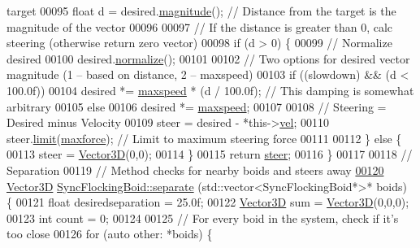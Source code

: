 \begin{DoxyCode}
{       target}
00095     \textcolor{keywordtype}{float} d = desired.\hyperlink{class_vector3_d_a1139cce4839680afb01a9612eda6e117}{magnitude}(); \textcolor{comment}{// Distance from the target is the magnitude of the vector}
00096     
00097     \textcolor{comment}{// If the distance is greater than 0, calc steering (otherwise return zero vector)}
00098     \textcolor{keywordflow}{if} (d > 0) \{
00099         \textcolor{comment}{// Normalize desired}
00100         desired.\hyperlink{class_vector3_d_abfb12ecb9c9beb88e095cc4a1a512d3c}{normalize}();
00101         
00102         \textcolor{comment}{// Two options for desired vector magnitude (1 -- based on distance, 2 -- maxspeed)}
00103         \textcolor{keywordflow}{if} ((slowdown) && (d < 100.0f))
00104             desired *= \hyperlink{class_sync_flocking_boid_a2dbbbab7d604e28ed779dbe098f9803d}{maxspeed} * (d / 100.0f); \textcolor{comment}{// This damping is somewhat arbitrary}
00105         \textcolor{keywordflow}{else}
00106             desired *= \hyperlink{class_sync_flocking_boid_a2dbbbab7d604e28ed779dbe098f9803d}{maxspeed};
00107         
00108         \textcolor{comment}{// Steering = Desired minus Velocity}
00109         steer = desired - *this->\hyperlink{class_sync_flocking_boid_a1b6cf043598e64ecd40ecd5b75beb01f}{vel};
00110         steer.\hyperlink{class_vector3_d_a662cc3834556d61ed29890135c280b04}{limit}(\hyperlink{class_sync_flocking_boid_add7d9f2bf292a749bd17e730027e7350}{maxforce});  \textcolor{comment}{// Limit to maximum steering force}
00111         
00112     \} \textcolor{keywordflow}{else} \{
00113         steer = \hyperlink{class_vector3_d}{Vector3D}(0,0);
00114     \}
00115     \textcolor{keywordflow}{return} \hyperlink{class_sync_flocking_boid_af08726d6328bb3d507d8630ba9090e17}{steer};
00116 \}
00117 
00118 \textcolor{comment}{// Separation}
00119 \textcolor{comment}{// Method checks for nearby boids and steers away}
\hypertarget{_sync_flocking_boid_8cpp_source_l00120}{}\hyperlink{class_sync_flocking_boid_a372baffa82756888408de186ea06715b}{00120} \hyperlink{class_vector3_d}{Vector3D} \hyperlink{class_sync_flocking_boid_a372baffa82756888408de186ea06715b}{SyncFlockingBoid::separate} (std::vector<SyncFlockingBoid*>* 
      boids) \{
00121     \textcolor{keywordtype}{float} desiredseparation = 25.0f;
00122     \hyperlink{class_vector3_d}{Vector3D} sum = \hyperlink{class_vector3_d}{Vector3D}(0,0,0);
00123     \textcolor{keywordtype}{int} count = 0;
00124     
00125     \textcolor{comment}{// For every boid in the system, check if it's too close}
00126     \textcolor{keywordflow}{for} (\textcolor{keyword}{auto} other: *boids) \{

\end{DoxyCode}
